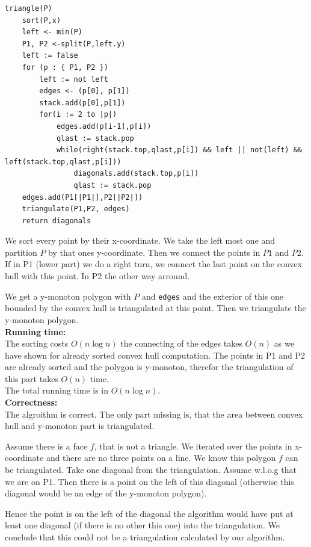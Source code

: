 \documentclass[11pt,a4paper,ngerman]{article}
\begin{document}
\begin{lstlisting}
triangle(P)
    sort(P,x)
    left <- min(P)
    P1, P2 <-split(P,left.y)
    left := false
    for (p : { P1, P2 })
        left := not left
        edges <- (p[0], p[1])
        stack.add(p[0],p[1])
        for(i := 2 to |p|)
            edges.add(p[i-1],p[i])
            qlast := stack.pop
            while(right(stack.top,qlast,p[i]) && left || not(left) && left(stack.top,qlast,p[i]))
                diagonals.add(stack.top,p[i])
                qlast := stack.pop
    edges.add(P1[|P1|],P2[|P2|])
    triangulate(P1,P2, edges)
    return diagonals
\end{lstlisting}

We sort every point by their x-coordinate. We take the left most one and partition $P$ by that ones y-coordinate.
Then we connect the points in $P1$ and $P2$. If in P1 (lower part) we do a right turn, we connect the last point on the convex hull
with this point. In P2 the other way arround.

We get a y-monoton polygon with $P$ and \lstinline|edges| and the exterior of this one bounded by the convex hull is triangulated at this point.
Then we triangulate the y-monoton polygon.\\

\textbf{Running time:}\\
The sorting costs $O(n \log n)$ the connecting of the edges takes $O(n)$ as we have shown for already sorted convex hull computation.
The points in P1 and P2 are already sorted and the polygon is y-monoton, therefor the triangulation of this part takes $O(n)$ time.\\

The total running time is in $O(n \log n)$.\\

\textbf{Correctness:}\\
The algroithm is correct. The only part missing is, that the area between convex hull and y-monoton part is triangulated.

Assume there is a face $f$, that is not a triangle. We iterated over the points in x-coordinate and there are no three points on a line.
We know this polygon $f$ can be triangulated. Take one diagonal from the triangulation. Assume w.l.o.g that we are on P1. Then
there is a point on the left of this diagonal (otherwise this diagonal would be an edge of the y-monoton polygon).

Hence the point is on the left of the diagonal the algorithm would have put at least one diagonal (if there is no other this one) into the
triangulation. We conclude that this could not be a triangulation calculated by our algorithm.

\label{LastPage}
\end{document}
